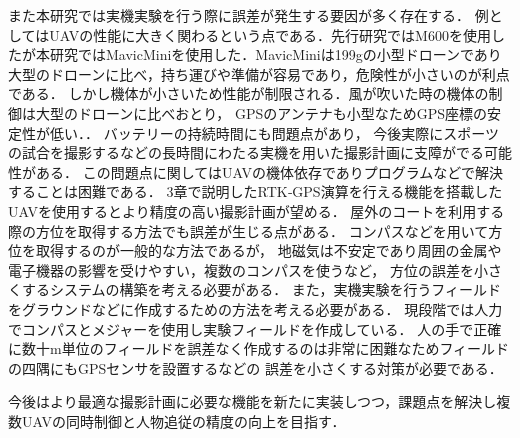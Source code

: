 \documentclass[autodetect-engine,dvipdfmx-if-dvi,ja=standard,a4j,jbase=11pt,magstyle=nomag*]{bxjsreport}
\begin{document}
また本研究では実機実験を行う際に誤差が発生する要因が多く存在する．
例としてはUAVの性能に大きく関わるという点である．先行研究ではM600を使用したが本研究ではMavicMiniを使用した．MavicMiniは199gの小型ドローンであり大型のドローンに比べ，持ち運びや準備が容易であり，危険性が小さいのが利点である．
しかし機体が小さいため性能が制限される．風が吹いた時の機体の制御は大型のドローンに比べおとり，
GPSのアンテナも小型なためGPS座標の安定性が低い．．
バッテリーの持続時間にも問題点があり，
今後実際にスポーツの試合を撮影するなどの長時間にわたる実機を用いた撮影計画に支障がでる可能性がある．
この問題点に関してはUAVの機体依存でありプログラムなどで解決することは困難である．
3章で説明したRTK‐GPS演算を行える機能を搭載したUAVを使用するとより精度の高い撮影計画が望める．
屋外のコートを利用する際の方位を取得する方法でも誤差が生じる点がある．
コンパスなどを用いて方位を取得するのが一般的な方法であるが，
地磁気は不安定であり周囲の金属や電子機器の影響を受けやすい，複数のコンパスを使うなど，
方位の誤差を小さくするシステムの構築を考える必要がある．
また，実機実験を行うフィールドをグラウンドなどに作成するための方法を考える必要がある．
現段階では人力でコンパスとメジャーを使用し実験フィールドを作成している．
人の手で正確に数十m単位のフィールドを誤差なく作成するのは非常に困難なためフィールドの四隅にもGPSセンサを設置するなどの
誤差を小さくする対策が必要である．

今後はより最適な撮影計画に必要な機能を新たに実装しつつ，課題点を解決し複数UAVの同時制御と人物追従の精度の向上を目指す．
\end{document}
